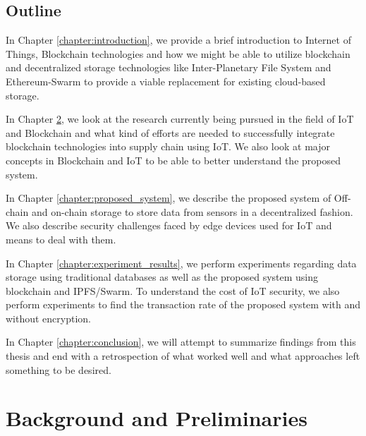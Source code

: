 \documentclass[11pt,openright]{report}
\begin{document}
\section{Outline}\label{section:outline}

In Chapter \ref{chapter:introduction}, we provide a brief introduction to Internet of Things, Blockchain technologies and how we might be able to utilize blockchain and decentralized storage technologies like Inter-Planetary File System and Ethereum-Swarm to provide a viable replacement for existing cloud-based storage.\newline

\noindent In Chapter \ref{chapter:background}, we look at the research currently being pursued in the field of IoT and Blockchain and what kind of efforts are needed to successfully integrate blockchain technologies into supply chain using IoT. We also look at major concepts in Blockchain and IoT to be able to better understand the proposed system.\newline

\noindent In Chapter \ref{chapter:proposed_system}, we describe the proposed system of Off-chain and on-chain storage to store data from sensors in a decentralized fashion. We also describe security challenges faced by edge devices used for IoT and means to deal with them.\newline

\noindent In Chapter \ref{chapter:experiment_results}, we perform experiments regarding data storage using traditional databases as well as the proposed system using blockchain and IPFS/Swarm. To understand the cost of IoT security, we also perform experiments to find the transaction rate of the proposed system with and without encryption.\newline

\noindent In Chapter \ref{chapter:conclusion}, we will attempt to summarize findings from this thesis and end with a retrospection of what worked well and what approaches left something to be desired.\newline 



\chapter{Background and Preliminaries} \label{chapter:background}
\end{document}

